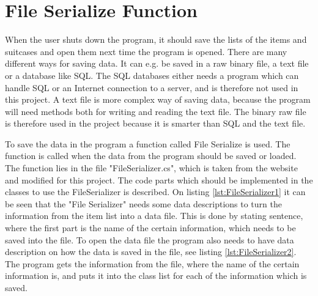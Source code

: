 \section{File Serialize Function}
When the user shuts down the program, it should save the lists of the items and suitcases and open them next time the program is opened. There are many different ways for saving data. It can e.g. be saved in a raw binary file, a text file or a database like SQL.
The SQL databases either needs a program which can handle SQL or an Internet connection to a server, and is therefore not used in this project. A text file is more complex way of saving data, because the program will need methods both for writing and reading the text file. The binary raw file is therefore used in the project because it is smarter than SQL and the text file.

To save the data in the program a function called File Serialize is used. The function is called when the data from the program should be saved or loaded. The function lies in the file "FileSerializer.cs", which is taken from the website \citep{FileSeria} and modified for this project. The code parts which should be implemented in the classes to use the FileSerializer is described.
On listing \ref{lst:FileSerializer1} it can be seen that the "File Serializer" needs some data descriptions to turn the information from the item list into a data file. This is done by stating sentence, where the first part is the name of the certain information, which needs to be saved into the file. 
To open the data file the program also needs to have data description on how the data is saved in the file, see listing \ref{lst:FileSerializer2}. The program gets the information from the file, where the name of the certain information is, and puts it into the class list for each of the information which is saved.